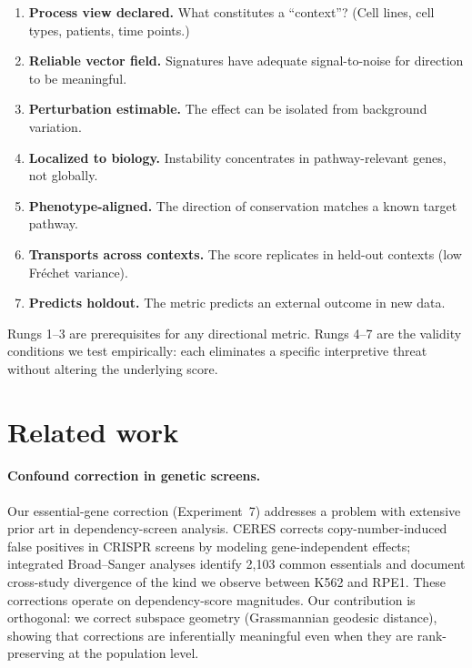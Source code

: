 \documentclass{article}
\begin{document}
\begin{enumerate}
  \item \textbf{Process view declared.} What constitutes a ``context''?
    (Cell lines, cell types, patients, time points.)
  \item \textbf{Reliable vector field.} Signatures have adequate signal-to-noise
    for direction to be meaningful.
  \item \textbf{Perturbation estimable.} The effect can be isolated from
    background variation.
  \item \textbf{Localized to biology.} Instability concentrates in
    pathway-relevant genes, not globally.
  \item \textbf{Phenotype-aligned.} The direction of conservation matches a
    known target pathway.
  \item \textbf{Transports across contexts.} The score replicates in held-out
    contexts (low Fr\'echet variance).
  \item \textbf{Predicts holdout.} The metric predicts an external outcome
    in new data.
\end{enumerate}

Rungs 1--3 are prerequisites for any directional metric. Rungs 4--7 are the
validity conditions we test empirically: each eliminates a specific
interpretive threat without altering the underlying score.

\section{Related work}

\paragraph{Confound correction in genetic screens.}
Our essential-gene correction (Experiment~7) addresses a problem with
extensive prior art in dependency-screen analysis. CERES
\citep{meyers2017ceres} corrects copy-number-induced false positives in
CRISPR screens by modeling gene-independent effects; integrated
Broad--Sanger analyses \citep{pacini2021integrated} identify 2{,}103 common
essentials and document cross-study divergence of the kind we observe between
K562 and RPE1. These corrections operate on dependency-score magnitudes. Our
contribution is orthogonal: we correct subspace geometry (Grassmannian
geodesic distance), showing that corrections are inferentially meaningful
even when they are rank-preserving at the population level.
\end{document}
